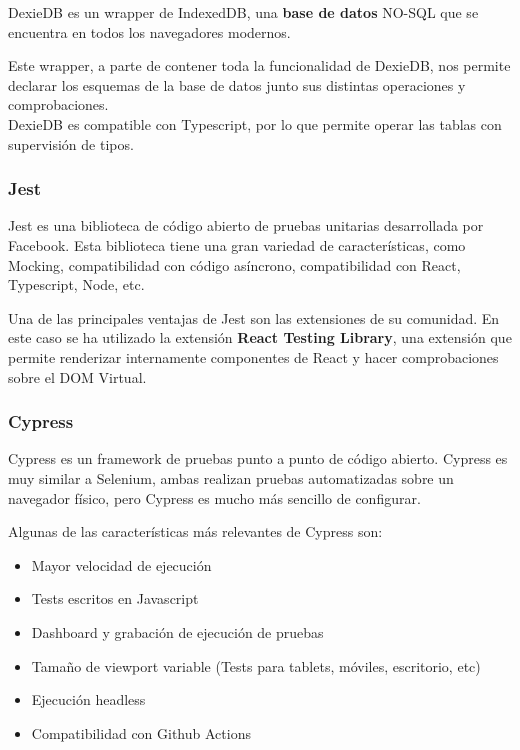DexieDB es un wrapper de IndexedDB, una \textbf{base de datos} NO-SQL
que se encuentra en todos los navegadores modernos.

Este wrapper, a parte de contener toda la funcionalidad de DexieDB, nos
permite declarar los esquemas de la base de datos junto sus distintas
operaciones y comprobaciones.\\
DexieDB es compatible con Typescript, por lo que permite operar las
tablas con supervisión de tipos.

\hypertarget{jest}{%
\subsubsection{Jest}\label{jest}}

Jest es una biblioteca de código abierto de pruebas unitarias
desarrollada por Facebook. Esta biblioteca tiene una gran variedad de
características, como Mocking, compatibilidad con código asíncrono,
compatibilidad con React, Typescript, Node, etc.

Una de las principales ventajas de Jest son las extensiones de su
comunidad. En este caso se ha utilizado la extensión \textbf{React
Testing Library}, una extensión que permite renderizar internamente
componentes de React y hacer comprobaciones sobre el DOM Virtual.

\hypertarget{section}{%
\subsubsection{}\label{section}}

\hypertarget{cypress}{%
\subsubsection{Cypress}\label{cypress}}

Cypress es un framework de pruebas punto a punto de código abierto.
Cypress es muy similar a Selenium, ambas realizan pruebas automatizadas
sobre un navegador físico, pero Cypress es mucho más sencillo de
configurar.

Algunas de las características más relevantes de Cypress son:

\begin{itemize}
\item
  Mayor velocidad de ejecución
\item
  Tests escritos en Javascript
\item
  Dashboard y grabación de ejecución de pruebas
\item
  Tamaño de viewport variable (Tests para tablets, móviles, escritorio,
  etc)
\item
  Ejecución headless
\item
  Compatibilidad con Github Actions
\end{itemize}

